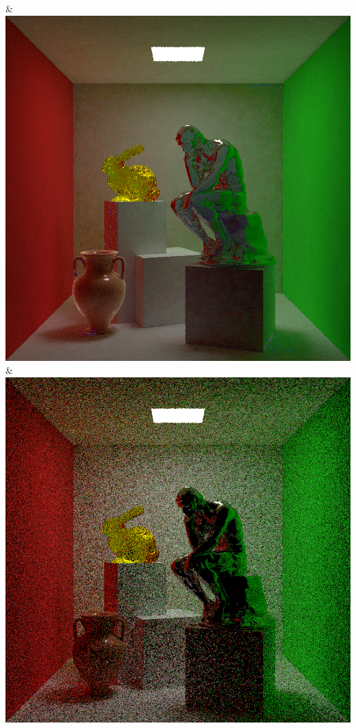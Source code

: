 & \includegraphics[width=\linewidth]{figures/py/tests/quality_comparison/nrc+sppc_1spp_thinker.png}
& \includegraphics[width=\linewidth]{figures/py/tests/quality_comparison/sppm_1spp_thinker.png}
